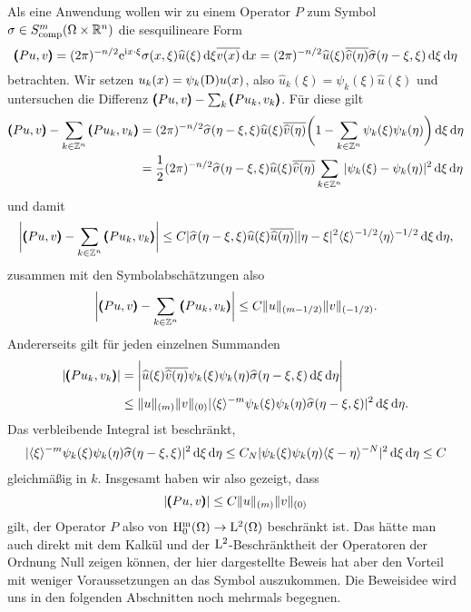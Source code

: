 Als eine Anwendung wollen wir zu einem Operator $P$ zum Symbol $\sigma\in S^m_{\rm comp} (\Omega\times\mathbb R^n)$ die sesquilineare Form
\begin{equation}
   \pmb(Pu,v\pmb) = (2\pi)^{-n/2} \relax \mathrm e^{\mathrm i x\cdot\xi} \sigma(x,\xi) \widehat u(\xi) \,\mathrm d\xi \overline{v(x)}\,\mathrm d x 
   = (2\pi)^{-n/2} \relax \widehat u(\xi) \overline{\widehat v(\eta)} \widehat\sigma(\eta-\xi,\xi) \,\mathrm d\xi\,\mathrm d\eta
\end{equation} 
betrachten. Wir setzen $u_k(x) = \psi_k(\mathrm D) u(x)$, also $\widehat u_k(\xi) = \psi_k(\xi) \widehat u(\xi)$ und untersuchen die Differenz 
$\pmb(Pu,v\pmb)-\sum_k \pmb(Pu_k,v_k\pmb)$. Für diese gilt
\begin{align}
       \pmb(Pu,v\pmb) -\sum_{k\in\mathbb Z^n} \pmb(Pu_k,v_k\pmb)  &= (2\pi)^{-n/2}  \relax \widehat\sigma (\eta-\xi,\xi) \widehat u(\xi) \overline{\widehat v(\eta)} \bigg( 1 - \sum_{k\in\mathbb Z^n} \psi_k(\xi)\psi_k(\eta)\bigg) \,\mathrm d\xi\,\mathrm d\eta  \notag\\
       &= \frac12 (2\pi)^{-n/2} \relax \widehat\sigma (\eta-\xi,\xi) \widehat u(\xi) \overline{\widehat v(\eta)}  \sum_{k\in\mathbb Z^n} | \psi_k(\xi)-\psi_k(\eta)|^2 \,\mathrm d\xi\,\mathrm d\eta 
\end{align}
und damit
\begin{equation}
   \bigg|\pmb(Pu,v\pmb) - \sum_{k\in\mathbb Z^n}\pmb(Pu_k,v_k\pmb)\bigg| \le C \relax | \widehat \sigma(\eta-\xi,\xi) \widehat u(\xi) \overline{\widehat u(\eta)}| |\eta-\xi|^2 \langle\xi\rangle^{-1/2} \langle\eta\rangle^{-1/2} \,\mathrm d\xi\,\mathrm d\eta, 
\end{equation}
zusammen mit den Symbolabschätzungen also
\begin{equation}
    \bigg|\pmb(Pu,v\pmb) - \sum_{k\in\mathbb Z^n}\pmb(Pu_k,v_k\pmb)\bigg| \le C \|u\|_{(m-1/2)} \|v\|_{(-1/2)}.
\end{equation}
 Andererseits gilt für jeden einzelnen Summanden
 \begin{align}
     |\pmb(Pu_k,v_k\pmb) | &= \bigg|\relax \widehat u(\xi) \overline{\widehat v(\eta)} \psi_k(\xi)\psi_k(\eta) \widehat\sigma(\eta-\xi,\xi) \,\mathrm d\xi\,\mathrm d\eta\bigg|
     \notag\\
     &\le \|u\|_{(m)}  \|v\|_{(0)} \relax | \langle\xi\rangle^{-m}\psi_k(\xi)\psi_k(\eta) \widehat\sigma(\eta-\xi,\xi)|^2 \,\mathrm d\xi\,\mathrm d\eta.
 \end{align}
Das verbleibende Integral ist beschränkt, 
\begin{align}
 \relax | \langle\xi\rangle^{-m}\psi_k(\xi)\psi_k(\eta) \widehat\sigma(\eta-\xi,\xi)|^2 \,\mathrm d\xi\,\mathrm d\eta 
 \le C_N  \relax | \psi_k(\xi)\psi_k(\eta) \langle \xi-\eta\rangle^{-N} |^2 \,\mathrm d\xi\,\mathrm d\eta \le C
\end{align}
gleichmäßig in $k$. Insgesamt haben wir also gezeigt, dass
\begin{equation}
   |\pmb(Pu,v\pmb)| \le C \|u\|_{(m)} \|v\|_{(0)}
\end{equation}
gilt, der Operator $P$ also von $\rm H^m_0(\Omega) \to \mathrm L^2(\Omega)$ beschränkt ist. Das hätte man auch direkt mit dem Kalkül und der $\mathrm L^2$-Beschränktheit der Operatoren der Ordnung Null zeigen können, der hier dargestellte Beweis hat aber den Vorteil mit weniger Voraussetzungen an das Symbol auszukommen. Die Beweisidee wird uns in den folgenden Abschnitten noch mehrmals begegnen.




